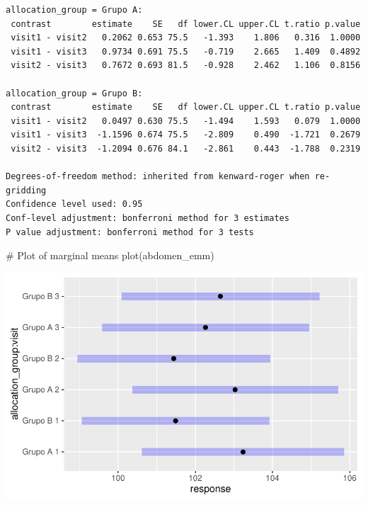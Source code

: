 \documentclass[
  letterpaper,
  DIV=11,
  numbers=noendperiod]{scrartcl}
\newenvironment{Shaded}{\begin{snugshade}}{\end{snugshade}}
\newcommand{\CommentTok}[1]{\textcolor[rgb]{0.37,0.37,0.37}{#1}}
\newcommand{\FunctionTok}[1]{\textcolor[rgb]{0.28,0.35,0.67}{#1}}
\newcommand{\NormalTok}[1]{\textcolor[rgb]{0.00,0.23,0.31}{#1}}
\begin{document}
\begin{verbatim}
allocation_group = Grupo A:
 contrast        estimate    SE   df lower.CL upper.CL t.ratio p.value
 visit1 - visit2   0.2062 0.653 75.5   -1.393    1.806   0.316  1.0000
 visit1 - visit3   0.9734 0.691 75.5   -0.719    2.665   1.409  0.4892
 visit2 - visit3   0.7672 0.693 81.5   -0.928    2.462   1.106  0.8156

allocation_group = Grupo B:
 contrast        estimate    SE   df lower.CL upper.CL t.ratio p.value
 visit1 - visit2   0.0497 0.630 75.5   -1.494    1.593   0.079  1.0000
 visit1 - visit3  -1.1596 0.674 75.5   -2.809    0.490  -1.721  0.2679
 visit2 - visit3  -1.2094 0.676 84.1   -2.861    0.443  -1.788  0.2319

Degrees-of-freedom method: inherited from kenward-roger when re-gridding 
Confidence level used: 0.95 
Conf-level adjustment: bonferroni method for 3 estimates 
P value adjustment: bonferroni method for 3 tests 
\end{verbatim}

\begin{Shaded}
\begin{Highlighting}[]
\CommentTok{\# Plot of marginal means}
\FunctionTok{plot}\NormalTok{(abdomen\_emm)}
\end{Highlighting}
\end{Shaded}

\includegraphics{Outcomes_V1V2V3_files/figure-pdf/abdomen_sens_emm-1.pdf}
\end{document}

